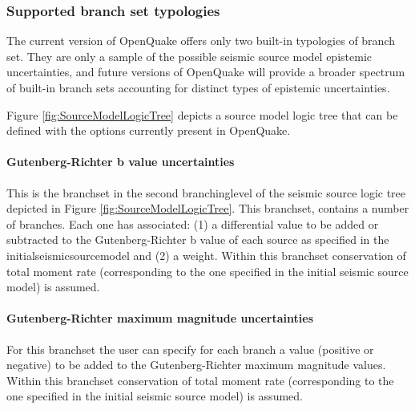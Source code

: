 \subsubsection{Supported branch set typologies}
The current version of OpenQuake offers only two built-in typologies of 
branch set. They are only a sample of the possible seismic source model 
epistemic uncertainties, and future versions of OpenQuake will provide 
a broader spectrum of built-in branch sets accounting for distinct 
types of epistemic uncertainties. 

Figure \ref{fig:SourceModelLogicTree} depicts a source model logic tree that 
can be defined with the options currently present in OpenQuake.
%
\paragraph{Gutenberg-Richter b value uncertainties}
This is the \gls{branchset} in the second \gls{branchinglevel} of the 
seismic source logic tree depicted in Figure \ref{fig:SourceModelLogicTree}. 
This \gls{branchset}, contains a number of branches. Each one has associated: 
(1) a differential value to be added or subtracted to the Gutenberg-Richter b 
value of each source as specified in the \gls{initialseismicsourcemodel} and 
(2) a weight.
Within this \gls{branchset} conservation of total moment rate 
(corresponding to the one specified in the initial seismic source model) 
is assumed.
%
\paragraph{Gutenberg-Richter maximum magnitude uncertainties}
For this \gls{branchset} the user can specify for each \gls{branch} a 
value (positive or negative) to be added to the Gutenberg-Richter maximum 
magnitude values. 
%
Within this \gls{branchset} conservation of total moment rate 
(corresponding to the one specified in the initial seismic source model) 
is assumed.